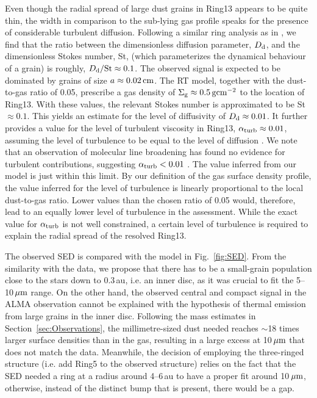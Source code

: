 \documentclass[fleqn,usenatbib,useAMS]{mnras}
\begin{document}
Even though the radial spread of large dust grains in Ring13 appears to be quite thin, the width in comparison to the sub-lying gas profile speaks for the presence of considerable turbulent diffusion. Following a similar ring analysis as in \citet{2018ApJ...869L..46D}, we find that the ratio between the dimensionless diffusion parameter, $D_{\rm d}$, and the dimensionless Stokes number, St, (which parameterizes the dynamical behaviour of a grain) is roughly, $D_{\rm d}/{\rm St}\approx 0.1$. The observed signal is expected to be dominated by grains of size $a\approx 0.02\,{\rm cm}$. The RT model, together with the dust-to-gas ratio of 0.05, prescribe a gas density of $\Sigma_{\rm g} \approx 0.5\,{\rm g}{\rm cm}^{-2}$ to the location of Ring13. With these values, the relevant Stokes number is approximated to be St$\approx 0.1$. This yields an estimate for the level of diffusivity of $D_{\rm d}\approx 0.01$. It further provides a value for the level of turbulent viscosity in Ring13, $\alpha_{\rm turb}\approx 0.01$, assuming the level of turbulence to be equal to the level of diffusion \citep{2007Icar..192..588Y}. We note that an observation of molecular line broadening has found no evidence for turbulent contributions, suggesting $\alpha_{\rm turb}<0.01$ \citep{Flaherty_2020}. The value inferred from our model is just within this limit. By our definition of the gas surface density profile, the value inferred for the level of turbulence is linearly proportional to the local dust-to-gas ratio. Lower values than the chosen ratio of 0.05 would, therefore, lead to an equally lower level of turbulence in the assessment. While the exact value for $\alpha_{\rm turb}$ is not well constrained, a certain level of turbulence is required to explain the radial spread of the resolved Ring13.

The observed SED is compared with the model in Fig.~\ref{fig:SED}. From the similarity with the data, we propose that there has to be a small-grain population close to the stars down to 0.3\,au, i.e. an inner disc, as it was crucial to fit the 5--10\,$\hbox{$\mu$m}$ range. On the other hand, the observed central and compact signal in the ALMA observation cannot be explained with the hypothesis of thermal emission from large grains in the inner disc. Following the mass estimates in Section~\ref{sec:Observations}, the millimetre-sized dust needed reaches $\sim$18 times larger surface densities than in the gas, resulting in a large excess at 10$\,\hbox{$\mu$m}$ that does not match the data. Meanwhile, the decision of employing the three-ringed structure (i.e. add Ring5 to the observed structure) relies on the fact that the SED needed a ring at a radius around 4--6\,au to have a proper fit around 10\,$\hbox{$\mu$m}$, otherwise, instead of the distinct bump that is present, there would be a gap.
\end{document}
